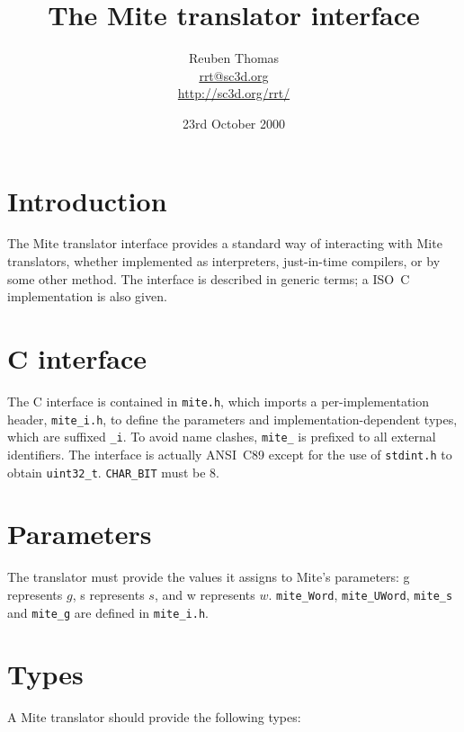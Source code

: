 \documentclass[english]{scrartcl}
\newcommand{\absfont}{\sffamily}
\newcommand{\abs}[1]{{\absfont #1}}
\begin{document}
\title{The Mite translator interface}
\author{Reuben Thomas\\\url{rrt@sc3d.org}\\\url{http://sc3d.org/rrt/}}
\date{23rd October 2000}
\maketitle



\section{Introduction}

The Mite translator interface provides a standard way of interacting
with Mite translators, whether implemented as interpreters,
just-in-time compilers, or by some other method. The interface is
described in generic terms; a ISO~C implementation is also given.



\section{C interface}

The C interface is contained in \verb|mite.h|, which imports a
per-implementation header, \verb|mite_i.h|, to define the parameters and
implementation-dependent types, which are suffixed \verb|_i|. To avoid name
clashes, \verb|mite_| is prefixed to all external identifiers. The
interface is actually ANSI~C89 except for the use of \verb|stdint.h| to
obtain \verb|uint32_t|. \verb|CHAR_BIT| must be $8$.



\section{Parameters}

The translator must provide the values it assigns to Mite's
parameters: \abs{g} represents $g$, \abs{s} represents $s$, and
\abs{w} represents $w$. \verb|mite_Word|, \verb|mite_UWord|, \verb|mite_s| and
\verb|mite_g| are defined in \verb|mite_i.h|.



\section{Types}

A Mite translator should provide the following types:
\end{document}
